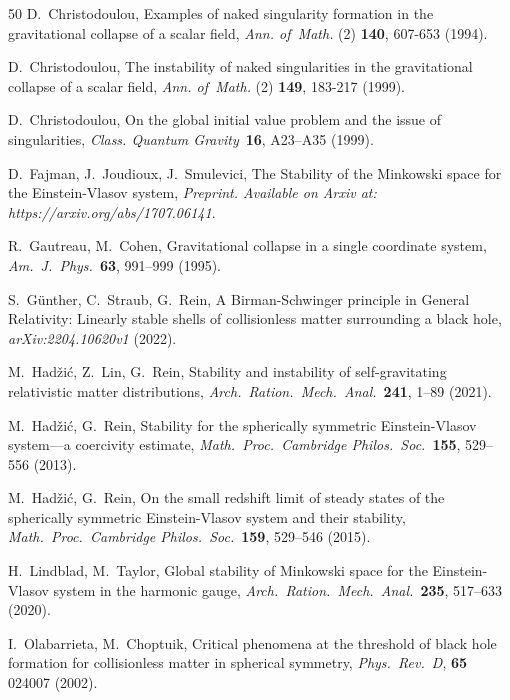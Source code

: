 \documentclass[11pt]{article}
\begin{document}
\begin{thebibliography}{50}
  {\sc D.~Christodoulou},
  Examples of naked singularity formation in the gravitational collapse of
  a scalar field, {\em Ann. of\ Math.} (2) {\bf 140}, 607-653 (1994).
  
  {\sc D.~Christodoulou}, The instability of naked singularities in
  the gravitational collapse of a scalar field, {\em Ann. of\ Math.} (2)
  {\bf 149}, 183-217 (1999).
  
  {\sc D.~Christodoulou},
  On the global initial value problem and the issue of singularities,
  {\em Class. Quantum Gravity}\ {\bf 16}, A23--A35 (1999).

  {\sc D.~Fajman, J.~Joudioux,  J.~Smulevici},
  The Stability of the Minkowski space for the Einstein-Vlasov system,
  {\em Preprint. Available on Arxiv at: https://arxiv.org/abs/1707.06141}.

  {\sc R.~Gautreau, M.~Cohen},
  Gravitational collapse in a single coordinate system,
  {\em Am.~J.~Phys.}\
  {\bf 63}, 991--999 (1995).
  
  {\sc S.~G\"unther, C.~Straub, G.~Rein}, 
  A Birman-Schwinger principle in General Relativity: Linearly stable shells
  of collisionless matter surrounding a black hole,
  {\em arXiv:2204.10620v1}  (2022).

  {\sc M.~Had\v zi\'c,  Z.~Lin, G.~Rein},
  Stability and instability of self-gravitating
  relativistic matter distributions,
  {\em Arch.\ Ration.\ Mech.\ Anal.}\ 
  {\bf 241}, 1--89 (2021).
  
  {\sc M.~Had\v zi\'c, G.~Rein},
  Stability for the spherically symmetric Einstein-Vlasov
  system---a coercivity estimate,
  {\em Math.\ Proc.\ Cambridge Philos.\ Soc.}\ 
  {\bf 155}, 529--556 (2013).
  
\bibitem{HaRe2014} 
  {\sc M.~Had\v zi\'c, G.~Rein},
  On the small redshift limit of steady states of the spherically
  symmetric Einstein-Vlasov system and their stability,
  {\em Math.\ Proc.\ Cambridge Philos.\ Soc.}\ 
  {\bf 159}, 529--546 (2015).
  
\bibitem{LiTa19} 
  {\sc H.~Lindblad, M.~Taylor},
  Global stability of Minkowski space for the Einstein-Vlasov system
  in the harmonic gauge,
  {\em Arch.\ Ration.\ Mech.\ Anal.}\ 
  {\bf 235}, 517--633 (2020).
  
\bibitem{OChop}
  {\sc I.~Olabarrieta, M.~Choptuik},
  Critical phenomena at the threshold of black hole formation
  for collisionless matter in spherical symmetry,
  {\em Phys.\ Rev.\ D},
  {\bf 65} 024007 (2002).
  

\end{thebibliography}
\end{document}
